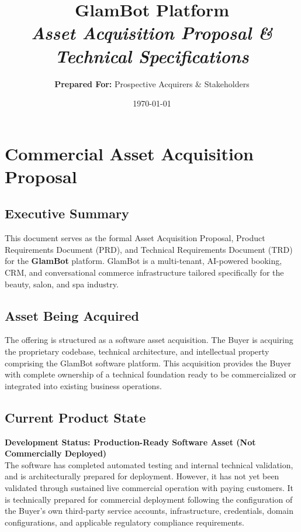 \documentclass[11pt,a4paper]{report}
\title{
    \vspace*{2cm}
    \Huge \textbf{GlamBot Platform}\\
    \vspace{0.5cm}
    \Large \textit{Asset Acquisition Proposal \& Technical Specifications}
}
\author{\textbf{Prepared For:} Prospective Acquirers \& Stakeholders}
\date{\today}
\begin{document}
\maketitle
\thispagestyle{empty}

\newpage
{}
\tableofcontents
\newpage
{}

\chapter{Commercial Asset Acquisition Proposal}

\section{Executive Summary}
This document serves as the formal Asset Acquisition Proposal, Product Requirements Document (PRD), and Technical Requirements Document (TRD) for the \textbf{GlamBot} platform. GlamBot is a multi-tenant, AI-powered booking, CRM, and conversational commerce infrastructure tailored specifically for the beauty, salon, and spa industry.

\section{Asset Being Acquired}
The offering is structured as a software asset acquisition. The Buyer is acquiring the proprietary codebase, technical architecture, and intellectual property comprising the GlamBot software platform. This acquisition provides the Buyer with complete ownership of a technical foundation ready to be commercialized or integrated into existing business operations.

\section{Current Product State}
\textbf{Development Status: Production-Ready Software Asset (Not Commercially Deployed)} \\
The software has completed automated testing and internal technical validation, and is architecturally prepared for deployment. However, it has not yet been validated through sustained live commercial operation with paying customers. It is technically prepared for commercial deployment following the configuration of the Buyer's own third-party service accounts, infrastructure, credentials, domain configurations, and applicable regulatory compliance requirements.
\end{document}
